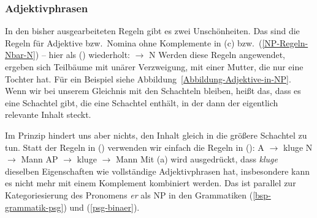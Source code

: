 
\subsubsection{Adjektivphrasen}



In den bisher ausgearbeiteten Regeln gibt es zwei Unschönheiten. Das sind die Regeln für Adjektive
bzw.\ Nomina ohne Komplemente in (c) bzw.\ (\ref{NP-Regeln-Nbar-N}) --  hier als () wiederholt:
\ea
\nbar $\to$ N
\z
Werden diese Regeln angewendet, ergeben sich Teilbäume mit unärer Verzweigung, \dash mit einer Mutter,
die nur eine Tochter hat. Für ein Beispiel siehe Abbildung~\ref{Abbildung-Adjektive-in-NP}. Wenn wir
bei unserem Gleichnis mit den Schachteln bleiben, heißt das, dass es eine Schachtel gibt, die eine
Schachtel enthält, in der dann der eigentlich relevante Inhalt steckt. 

Im Prinzip hindert uns aber nichts, den Inhalt gleich in die größere Schachtel zu tun. Statt der
Regeln in () verwenden wir einfach die Regeln in ():
\eal
\ex A $\to$ kluge
\ex N $\to$ Mann
\zl
\eal
\label{Lexikon-Projektion}
\ex AP $\to$ kluge
\ex \nbar $\to$ Mann
\zl
Mit (a) wird ausgedrückt, dass \emph{kluge} dieselben Eigenschaften wie vollständige
Adjektivphrasen hat, insbesondere kann es nicht mehr mit einem Komplement kombiniert werden. Das ist
parallel zur Kategoriesierung des Pronomens \emph{er} als NP in den Grammatiken
(\ref{bsp-grammatik-psg}) und (\ref{psg-binaer}).


